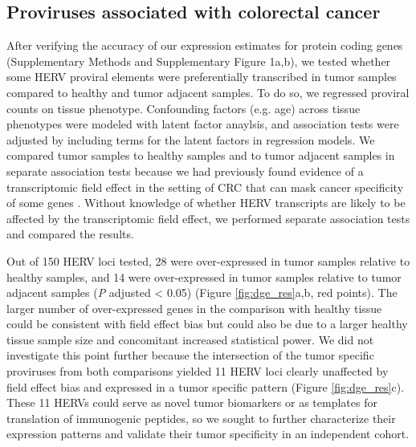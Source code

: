 \subsection*{Proviruses associated with colorectal cancer}
After verifying the accuracy of our expression estimates for protein coding genes (Supplementary Methods and Supplementary Figure 1a,b), we tested whether some HERV proviral elements were preferentially transcribed in tumor samples compared to healthy and tumor adjacent samples.
To do so, we regressed proviral counts on tissue phenotype.
Confounding factors (e.g. age) across tissue phenotypes were modeled with latent factor anaylsis, and association tests were adjusted by including terms for the latent factors in regression models.
We compared tumor samples to healthy samples and to tumor adjacent samples in separate association tests because we had previously found evidence of a transcriptomic field effect in the setting of CRC that can mask cancer specificity of some genes \citep{Dampier2020}.
Without knowledge of whether HERV transcripts are likely to be affected by the transcriptomic field effect, we performed separate association tests and compared the results.

Out of 150 HERV loci tested, 28 were over-expressed in tumor samples relative to healthy samples, and 14 were over-expressed in tumor samples relative to tumor adjacent samples (\emph{P} adjusted < 0.05) (Figure \ref{fig:dge_res}a,b, red points).
The larger number of over-expressed genes in the comparison with healthy tissue could be consistent with field effect bias but could also be due to a larger healthy tissue sample size and concomitant increased statistical power.
We did not investigate this point further because the intersection of the tumor specific proviruses from both comparisons yielded 11 HERV loci clearly unaffected by field effect bias and expressed in a tumor specific pattern (Figure \ref{fig:dge_res}c).
These 11 HERVs could serve as novel tumor biomarkers or as templates for translation of immunogenic peptides, so we sought to further characterize their expression patterns and validate their tumor specificity in an independent cohort.

